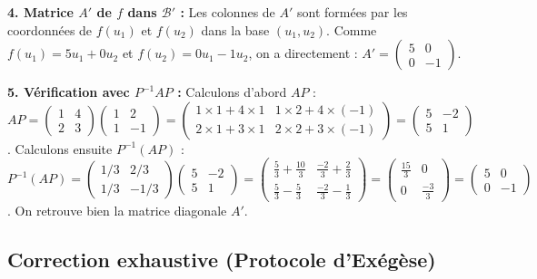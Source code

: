 \documentclass{report}
\begin{document}
\textbf{4. Matrice $A'$ de $f$ dans $\mathcal{B}'$ :}
Les colonnes de $A'$ sont formées par les coordonnées de $f(u_1)$ et $f(u_2)$ dans la base $(u_1, u_2)$.
Comme $f(u_1) = 5u_1 + 0u_2$ et $f(u_2) = 0u_1 - 1u_2$, on a directement :
$A' = \begin{pmatrix} 5 & 0 \\ 0 & -1 \end{pmatrix}$.

\textbf{5. Vérification avec $P^{-1} A P$ :}
Calculons d'abord $AP$ :
$AP = \begin{pmatrix} 1 & 4 \\ 2 & 3 \end{pmatrix} \begin{pmatrix} 1 & 2 \\ 1 & -1 \end{pmatrix} = \begin{pmatrix} 1 \times 1 + 4 \times 1 & 1 \times 2 + 4 \times (-1) \\ 2 \times 1 + 3 \times 1 & 2 \times 2 + 3 \times (-1) \end{pmatrix} = \begin{pmatrix} 5 & -2 \\ 5 & 1 \end{pmatrix}$.
Calculons ensuite $P^{-1}(AP)$ :
$P^{-1}(AP) = \begin{pmatrix} 1/3 & 2/3 \\ 1/3 & -1/3 \end{pmatrix} \begin{pmatrix} 5 & -2 \\ 5 & 1 \end{pmatrix} = \begin{pmatrix} \frac{5}{3} + \frac{10}{3} & \frac{-2}{3} + \frac{2}{3} \\ \frac{5}{3} - \frac{5}{3} & \frac{-2}{3} - \frac{1}{3} \end{pmatrix} = \begin{pmatrix} \frac{15}{3} & 0 \\ 0 & \frac{-3}{3} \end{pmatrix} = \begin{pmatrix} 5 & 0 \\ 0 & -1 \end{pmatrix}$.
On retrouve bien la matrice diagonale $A'$.







\subsection*{Correction exhaustive (Protocole d'Exégèse)}
\end{document}
